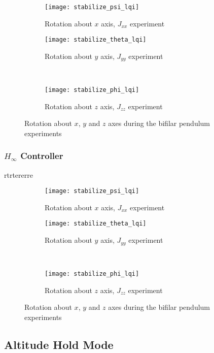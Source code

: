 \begin{figure}[H]
\begin{subfigure}{.5\linewidth}
\centering
\texttt{[image: stabilize\_psi\_lqi]}
\caption{Rotation about $x$ axis, $J_{xx}$ experiment}
\label{fig:stabilize_psi_lqi}
\end{subfigure}%
\begin{subfigure}{.5\linewidth}
\centering
\texttt{[image: stabilize\_theta\_lqi]}
\caption{Rotation about $y$ axis, $J_{yy}$ experiment}
\label{fig:stabilize_theta_lqi}
\end{subfigure}\\[1ex]
\begin{subfigure}{\linewidth}
\centering
\texttt{[image: stabilize\_phi\_lqi]}
\caption{Rotation about $z$ axis, $J_{zz}$ experiment}
\label{fig:stabilize_psi_lqi}
\end{subfigure}
\caption{Rotation about $x$, $y$ and $z$ axes during the bifilar pendulum experiments}
\label{fig:stabilize_lqi}
\end{figure}

\subsubsection{$H_\infty$ Controller}
rtrtererre
\begin{figure}[H]
\begin{subfigure}{.5\linewidth}
\centering
\texttt{[image: stabilize\_psi\_lqi]}
\caption{Rotation about $x$ axis, $J_{xx}$ experiment}
\label{fig:stabilize_psi_lqi}
\end{subfigure}%
\begin{subfigure}{.5\linewidth}
\centering
\texttt{[image: stabilize\_theta\_lqi]}
\caption{Rotation about $y$ axis, $J_{yy}$ experiment}
\label{fig:stabilize_theta_lqi}
\end{subfigure}\\[1ex]
\begin{subfigure}{\linewidth}
\centering
\texttt{[image: stabilize\_phi\_lqi]}
\caption{Rotation about $z$ axis, $J_{zz}$ experiment}
\label{fig:stabilize_psi_lqi}
\end{subfigure}
\caption{Rotation about $x$, $y$ and $z$ axes during the bifilar pendulum experiments}
\label{fig:stabilize_lqi}
\end{figure}


\subsection{Altitude Hold Mode}
